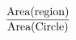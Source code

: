 \documentclass[preview]{standalone}
\begin{document}
\begin{align*}
\text{Area} ( \text{region} ) \over \text{Area}( \text{Circle} )
\end{align*}
\end{document}
